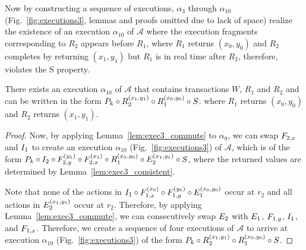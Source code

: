 
Now by constructing a sequence of executions, $\alpha_3$ through $\alpha_{10}$ (Fig.~\ref{fig:executions3}, lemmas and proofs omitted due to lack of space) realize the existence of an execution $\alpha_{10}$  of $\mathcal{A}$ where the execution fragments corresponding to $R_2$ appears 
before $R_1$, where  $R_1$ returns $(x_0, y_0)$ and $R_2$ completes by returning $(x_1, y_1)$
but $R_1$ is in real time after $R_2$, therefore, violates the S property.
\begin{lemma}   \label{lem:exec3_alpha11} 
\sloppy There exists an execution $\alpha_{10}$  of $\mathcal{A}$ that contains transactions $W$, $R_1$ and $R_2$
and   can be written in the form 
$\finiteprefixA{k-1}{k}   \circ
\frage{R_2}{}{x_1, y_1} \circ
 \frage{R_1}{}{x_0, y_0}
 \circ \fragt{S}{\alpha_{10}}{}$.
where $R_1$ returns $(x_0, y_0)$ and $R_2$ returns $(x_1, y_1)$.
\end{lemma}
\begin{proof}
Now, by applying Lemma~\ref{lem:exec3_commute} to $\alpha_{9}$, we can swap 
 $\fragt{F_{2,x}}{}{}$  and $ \fragt{I_1}{}{}$ to create an execution $\alpha_{10}$  (Fig.~\ref{fig:executions3}) of $\mathcal{A}$, which is
of the form 
$ \finiteprefixA{k-1}{k}   \circ 
\fragt{I_2}{\alpha_9}{} \circ \fragt{F_{2,y}}{\alpha_9}{y_1} 
\circ   \fragt{F_{2,x}}{\alpha_9}{x_1}  \circ 
\frage{R_1}{}{x_0, y_0} \circ \fragt{E_2}{\alpha_8}{x_1, y_1}
 \circ \fragt{S}{\alpha_9}{}$, where the returned values are determined by  Lemma~\ref{lem:exec3_consistent}.
 
Note that none of the actions in 
$\fragt{I_1}{\alpha_9}{} \circ \fragt{F_{1,x}}{\alpha_9}{x_0} 
 \circ \fragt{F_{1,y}}{\alpha_9}{y_0} \circ \fragt{E_1}{\alpha_9}{x_0, y_0}$
occur at $r_2$ and all actions in $\fragt{E_2}{\alpha_9}{x_1, y_1} $ occur at $r_2$. Therefore, by 
applying Lemma~\ref{lem:exec3_commute}, we can consecutively swap $\fragt{E_2}{}{}$ with 
%
$\fragt{E_1}{}{}$, $\fragt{F_{1,y}}{}{}$,  $\fragt{I_1}{}{}$,  and $\fragt{F_{1,x}}{}{}$. Therefore, we create a sequence of 
four executions of $\mathcal{A}$ to arrive at execution $\alpha_{10}$ (Fig.~\ref{fig:executions3}) of the form
$\finiteprefixA{k-1}{k}   \circ
\frage{R_2}{}{x_1, y_1}
 \circ
 \frage{R_1}{}{x_0, y_0}
 \circ \fragt{S}{\alpha_{10}}{}$.
\end{proof}
